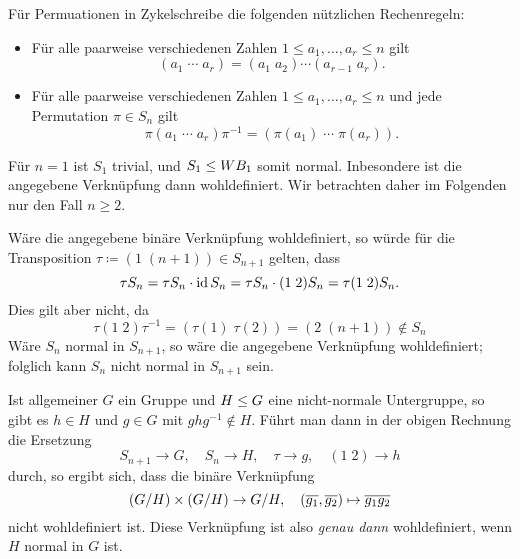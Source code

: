 \section{}





\subsection{}

\begin{remark}
  Für Permuationen in Zykelschreibe die folgenden nützlichen Rechenregeln:
  \begin{itemize}
    \item
      Für alle paarweise verschiedenen Zahlen $1 \leq a_1, \dotsc, a_r \leq n$ gilt
      \[
          (a_1 \; \dotsm \; a_r)
        = (a_1 \; a_2) \dotsm (a_{r-1} \; a_r).
      \]
    \item
      Für alle paarweise verschiedenen Zahlen $1 \leq a_1, \dotsc, a_r \leq n$ und jede Permutation $\pi \in S_n$ gilt
      \[
          \pi (a_1 \; \dotsm \; a_r) \pi^{-1}
        = ( \pi(a_1) \; \dotsm \; \pi(a_r) ).
      \]
  \end{itemize}
\end{remark}

Für $n = 1$ ist $S_1$ trivial, und $S_1 \leq WB_1$ somit normal.
Inbesondere ist die angegebene Verknüpfung dann wohldefiniert.
Wir betrachten daher im Folgenden nur den Fall $n \geq 2$.

Wäre die angegebene binäre Verknüpfung wohldefiniert, so würde für die Transposition $\tau \coloneqq (1 \; (n+1)) \in S_{n+1}$ gelten, dass
\[
    \tau S_n
  =  \tau S_n \cdot \operatorname{id} S_n
  =  \tau S_n \cdot (1 \; 2) S_n
  =  \tau(1 \; 2) S_n.
\]
Dies gilt aber nicht, da
\[
          \tau (1 \; 2) \tau^{-1}
  =       ( \tau(1) \; \tau(2) )
  =       (2 \; (n+1))
  \notin  S_n
\]
Wäre $S_n$ normal in $S_{n+1}$, so wäre die angegebene Verknüpfung wohldefiniert;
folglich kann $S_n$ nicht normal in $S_{n+1}$ sein.

\begin{remark}
  Ist allgemeiner $G$ ein Gruppe und $H \leq G$ eine nicht-normale Untergruppe, so gibt es $h \in H$ und $g \in G$ mit $g h g^{-1} \notin H$.
  Führt man dann in der obigen Rechnung die Ersetzung
  \[
    S_{n+1}   \to G,
    \quad
    S_n       \to H,
    \quad
    \tau      \to g,
    \quad
    (1 \; 2)  \to h
  \]
  durch, so ergibt sich, dass die binäre Verknüpfung
  \[
            (G/H) \times (G/H)
    \to     G/H,
    \quad   (\overline{g_1}, \overline{g_2})
    \mapsto \overline{g_1 g_2}
  \]
  nicht wohldefiniert ist.
  Diese Verknüpfung ist also \emph{genau dann} wohldefiniert, wenn $H$ normal in $G$ ist.
\end{remark}





